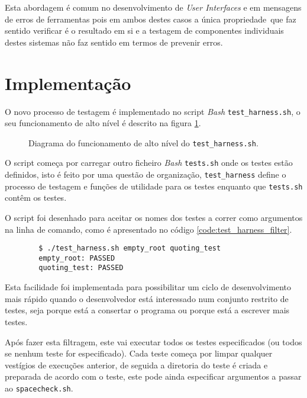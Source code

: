 Esta abordagem é comum no desenvolvimento de \emph{User Interfaces}
\cite{ebayScreenshotTesting} e em mensagens de erros de ferramentas
\cite{brsonRustTested} pois em ambos destes casos a única propriedade\ que faz
sentido verificar é o resultado em si e a testagem de componentes individuais
destes sistemas não faz sentido em termos de prevenir erros.

\section{Implementação}

O novo processo de testagem é implementado no script \emph{Bash}
\Verb|test_harness.sh|, o seu funcionamento de alto nível é descrito na
figura \ref{fig:testing_diagram}.

\begin{figure}[H]
	\centering
	\begin{tikzpicture}[node distance=2cm]
		
	\end{tikzpicture}
	\cprotect\caption{Diagrama do funcionamento de alto nível do \Verb|test_harness.sh|.}
	\label{fig:testing_diagram}
\end{figure}

O script começa por carregar outro ficheiro \emph{Bash} \Verb|tests.sh| onde os testes
estão definidos, isto é feito por uma questão de organização,
\Verb|test_harness| define o processo de testagem e funções de utilidade para os
testes enquanto que \Verb|tests.sh| contêm os testes.

O script foi desenhado para aceitar os nomes dos testes a correr como argumentos
na linha de comando, como é apresentado no código \ref{code:test_harness_filter}.

\begin{listing}[H]
	\begin{verbatim}
		$ ./test_harness.sh empty_root quoting_test
		empty_root: PASSED
		quoting_test: PASSED
	\end{verbatim}
	\cprotect\caption{Exemplo de uso do \Verb|test_harness.sh| com filtragem.}
	\label{code:test_harness_filter}
\end{listing}

Esta facilidade foi implementada para possibilitar um ciclo de desenvolvimento
mais rápido quando o desenvolvedor está interessado num conjunto restrito de
testes, seja porque está a consertar o programa ou porque está a escrever mais
testes.

Após fazer esta filtragem, este vai executar todos os testes especificados
(ou todos se nenhum teste for especificado). Cada teste começa por limpar
qualquer vestígios de execuções anterior, de seguida a diretoria do teste
é criada e preparada de acordo com o teste, este pode ainda especificar
argumentos a passar ao \Verb|spacecheck.sh|.

